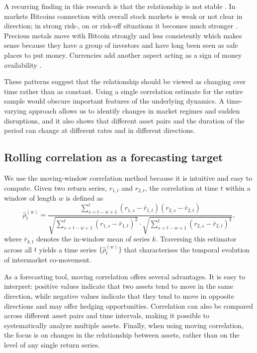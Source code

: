 A recurring finding in this research is that the relationship is not stable \cite{bouri2017hedge,corbet2018exploring}. In markets Bitcoins connection with overall stock markets is weak or not clear in direction; in strong risk-, on or risk-off situations it becomes much stronger \cite{ji2018network,kristoufek2015main}. Precious metals move with Bitcoin strongly and less consistently \cite{dyhrberg2016bitcoin,klein2018bitcoin} which makes sense because they have a group of investors and have long been seen as safe places to put money. Currencies add another aspect acting as a sign of money availability \cite{corbet2018exploring}.

These patterns suggest that the relationship should be viewed as changing over time rather than as constant. Using a single correlation estimate for the entire sample would obscure important features of the underlying dynamics. A time-varying approach allows us to identify changes in market regimes and sudden disruptions, and it also shows that different asset pairs and the duration of the period can change at different rates and in different directions.

\subsection{Rolling correlation as a forecasting target}

We use the moving-window correlation method because it is intuitive and easy to compute. Given two return series, ${r_{1,t}}$ and ${r_{2,t}}$, the correlation at time $t$ within a window of length $w$ is defined as
\begin{equation}
    \hat{\rho}_{t}^{(w)} = \frac{\sum_{s=t-w+1}^{t}(r_{1,s} - \bar{r}_{1,t})(r_{2,s} - \bar{r}_{2,t})}
    {\sqrt{\sum_{s=t-w+1}^{t}(r_{1,s} - \bar{r}_{1,t})^{2}} \cdot
     \sqrt{\sum_{s=t-w+1}^{t}(r_{2,s} - \bar{r}_{2,t})^{2}}},
\end{equation}
where $\bar{r}_{k,t}$ denotes the in-window mean of series $k$. Traversing this estimator across all $t$ yields a time series $\{\hat{\rho}_{t}^{(w)}\}$ that characterises the temporal evolution of intermarket co-movement.

As a forecasting tool, moving correlation offers several advantages. It is easy to interpret: positive values indicate that two assets tend to move in the same direction, while negative values indicate that they tend to move in opposite directions and may offer hedging opportunities. Correlation can also be compared across different asset pairs and time intervals, making it possible to systematically analyze multiple assets. Finally, when using moving correlation, the focus is on changes in the relationship between assets, rather than on the level of any single return series.

